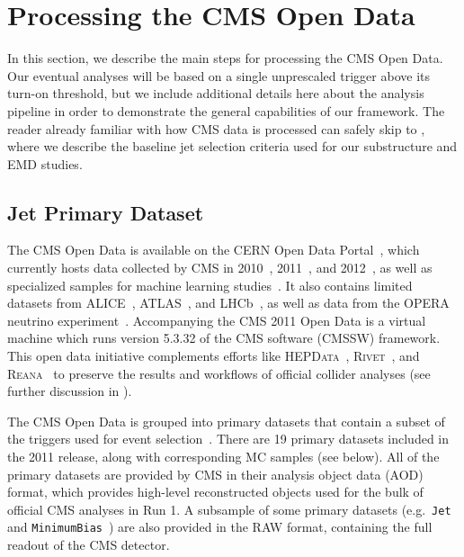 \documentclass[aps,prd,twocolumn,preprintnumbers,nofootinbib,longbibliography,floatfix,superscriptaddress]{revtex4-1}
\begin{document}
\newpage



\section{Processing the CMS Open Data}
\label{sec:cmsopendata}

In this section, we describe the main steps for processing the CMS Open Data.
%
Our eventual analyses will be based on a single unprescaled trigger above its turn-on threshold, but we include additional details here about the analysis pipeline in order to demonstrate the general capabilities of our framework.
%
The reader already familiar with how CMS data is processed can safely skip to , where we describe the baseline jet selection criteria used for our substructure and EMD studies. 


\subsection{Jet Primary Dataset}
\label{subsec:jetprimary}


The CMS Open Data is available on the CERN Open Data Portal~\cite{CERNOpenDataPortal}, which currently hosts data collected by CMS in 2010~\cite{CMS2010Release}, 2011~\cite{CMS2011Release}, and 2012~\cite{CMS2012Release}, as well as specialized samples for machine learning studies~\cite{CMSMLRelease}.
%
It also contains limited datasets from ALICE~\cite{ALICE2014Release}, ATLAS~\cite{ATLAS2016Release}, and LHCb~\cite{LHCbMasterclass}, as well as data from the OPERA neutrino experiment~\cite{OPERA2018Release}.
%
Accompanying the CMS 2011 Open Data is a virtual machine which runs version 5.3.32 of the CMS software (CMSSW) framework.
%
This open data initiative complements efforts like \textsc{HEPData}~\cite{HEPData}, \textsc{Rivet}~\cite{RIVET}, and \textsc{Reana}~\cite{REANA} to preserve the results and workflows of official collider analyses (see further discussion in ).


The CMS Open Data is grouped into primary datasets that contain a subset of the triggers used for event selection~\cite{Khachatryan:2016bia}.
%
There are 19 primary datasets included in the 2011 release, along with corresponding MC samples (see  below).
%
All of the primary datasets are provided by CMS in their analysis object data (AOD) format, which provides high-level reconstructed objects used for the bulk of official CMS analyses in Run 1.
%
A subsample of some primary datasets (e.g.\ \texttt{Jet}~\cite{CMS:JetRAW2011A} and \texttt{MinimumBias}~\cite{CMS:MinimumBiasRAW2011A}) are also provided in the RAW format, containing the full readout of the CMS detector.
\end{document}
